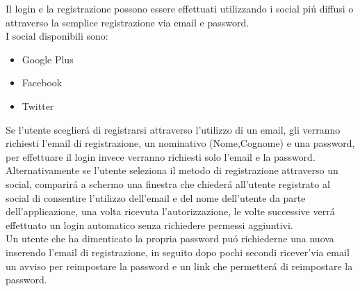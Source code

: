 Il login e la registrazione possono essere effettuati utilizzando i social pi\'u diffusi o attraverso la semplice registrazione via email e password.\\
I social disponibili sono:
\begin{itemize}
  \item Google Plus
  \item Facebook
  \item Twitter
\end{itemize}
Se l'utente sceglier\'a di registrarsi attraverso l'utilizzo di un email, gli verranno richiesti l'email di registrazione, un nominativo (Nome,Cognome) e una password, per effettuare il login invece verranno richiesti solo l'email e la password.\\
Alternativamente se l'utente seleziona il metodo di registrazione attraverso un social, comparir\'a a schermo una finestra che chieder\'a all'utente registrato al social di consentire l'utilizzo dell'email e del nome dell'utente da parte dell'applicazione, una volta ricevuta l'autorizzazione, le volte successive verr\'a effettuato un login automatico senza richiedere permessi aggiuntivi.\\
Un utente che ha dimenticato la propria password pu\'o richiederne una nuova inserendo l'email di registrazione, in seguito dopo pochi secondi ricever'\a via email un avviso per reimpostare la password e un link che permetter\'a di reimpostare la password.\\




